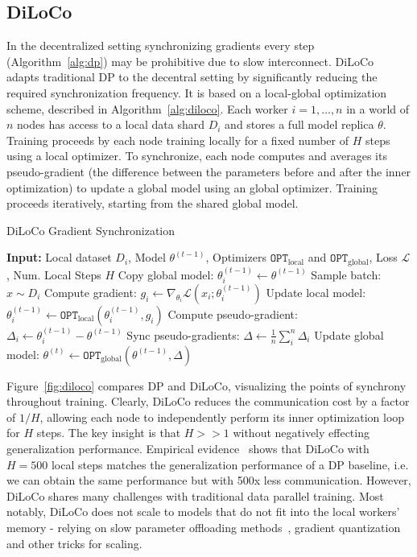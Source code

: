 \documentclass{article}
\begin{document}
\subsection{DiLoCo}

In the decentralized setting synchronizing gradients every step
(Algorithm~\ref{alg:dp}) may be prohibitive due to slow interconnect.
DiLoCo~\cite{douillard2023diloco} adapts traditional DP to the decentral
setting by significantly reducing the required synchronization frequency. It is
based on a local-global optimization scheme, described in
Algorithm~\ref{alg:diloco}. Each worker $i=1,\dots,n$ in a world of
$n$ nodes has access to a local data shard $D_i$ and stores a full model replica
$\theta$. Training proceeds by each node training locally for a fixed number of
$H$ steps using a local optimizer. To synchronize, each node computes and
averages its pseudo-gradient (the difference between the parameters before and
after the inner optimization) to update a global model using an global
optimizer. Training proceeds iteratively, starting from the shared global model.

\begin{algorithm}
\caption{DiLoCo Gradient Synchronization}
\label{alg:diloco}
\begin{algorithmic}[1]
\State \textbf{Input:} Local dataset $D_i$, Model $\theta^{(t-1)}$, Optimizers $\mathtt{OPT}_{\text{local}}$ and $\mathtt{OPT}_{\text{global}}$, Loss $\mathcal{L}$, Num. Local Steps $H$ 
\State Copy global model: $\theta_i^{(t-1)} \gets \theta^{(t-1)}$
  \State Sample batch: $x \sim D_i$
  \State Compute gradient: $g_i \gets \nabla_{\theta_i} \mathcal{L}(x_i; \theta_i^{(t-1)})$
  \State Update local model: $\theta_i^{(t-1)} \gets \mathtt{OPT}_{\text{local}}(\theta_i^{(t-1)}, g_i)$
\EndFor
\State Compute pseudo-gradient: $\Delta_i \gets \theta_i^{(t-1)} - \theta^{(t-1)}$
\State Sync pseudo-gradients: $\Delta \gets \frac{1}{n}\sum_i^n \Delta_i$ 
\State Update global model: $\theta^{(t)} \gets \mathtt{OPT}_{\text{global}}(\theta^{(t-1)}, \Delta)$
\end{algorithmic}
\end{algorithm}

Figure~\ref{fig:diloco} compares DP and DiLoCo, visualizing the points of
synchrony throughout training. Clearly, DiLoCo reduces the communication cost by
a factor of $1/H$, allowing each node to independently perform its inner
optimization loop for $H$ steps. The key insight is that $H>>1$ without
negatively effecting generalization performance. Empirical
evidence~\cite{douillard2023diloco,jaghouar2024opendiloco} shows that DiLoCo
with $H=500$ local steps matches the generalization performance of a DP
baseline, i.e. we can obtain the same performance but with 500x less
communication. However, DiLoCo shares many challenges with traditional data
parallel training. Most notably, DiLoCo does not scale to models that do not fit
into the local workers' memory - relying on slow parameter offloading
methods~\cite{cui2016}, gradient quantization~\cite{jaghouar2024intellect1} and
other tricks for scaling.
\end{document}
